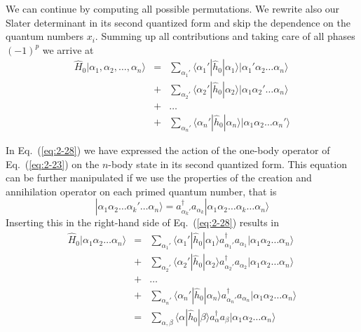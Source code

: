 We can continue by computing all possible permutations. 
We rewrite also our Slater determinant in its second quantized form and skip the dependence on the quantum numbers $x_i.$
Summing up all contributions and taking care of all phases
$(-1)^p$ we arrive at 
\begin{align}
	\hat{H}_0|\alpha_1,\alpha_2,\dots, \alpha_n\rangle &=& \sum_{\alpha_1'}\langle \alpha_1'|\hat{h}_0|\alpha_1\rangle
		|\alpha_1'\alpha_2 \dots \alpha_{n}\rangle \nonumber \\
	&+& \sum_{\alpha_2'} \langle \alpha_2'|\hat{h}_0|\alpha_2\rangle
		|\alpha_1\alpha_2' \dots \alpha_{n}\rangle \nonumber \\
	&+& \dots \nonumber \\
	&+& \sum_{\alpha_n'} \langle \alpha_n'|\hat{h}_0|\alpha_n\rangle
		|\alpha_1\alpha_2 \dots \alpha_{n}'\rangle \label{eq:2-28}
\end{align}

In Eq.~(\ref{eq:2-28}) 
we have expressed the action of the one-body operator
of Eq.~(\ref{eq:2-23}) on the  $n$-body state in its second quantized form.
This equation can be further manipulated if we use the properties of the creation and annihilation operator
on each primed quantum number, that is
\begin{equation}
	|\alpha_1\alpha_2 \dots \alpha_k' \dots \alpha_{n}\rangle = 
		a_{\alpha_k'}^{\dagger}  a_{\alpha_k} |\alpha_1\alpha_2 \dots \alpha_k \dots \alpha_{n}\rangle \label{eq:2-29}
\end{equation}
Inserting this in the right-hand side of Eq.~(\ref{eq:2-28}) results in
\begin{align}
	\hat{H}_0|\alpha_1\alpha_2 \dots \alpha_{n}\rangle &=& \sum_{\alpha_1'}\langle \alpha_1'|\hat{h}_0|\alpha_1\rangle
		a_{\alpha_1'}^{\dagger}  a_{\alpha_1} |\alpha_1\alpha_2 \dots \alpha_{n}\rangle \nonumber \\
	&+& \sum_{\alpha_2'} \langle \alpha_2'|\hat{h}_0|\alpha_2\rangle
		a_{\alpha_2'}^{\dagger}  a_{\alpha_2} |\alpha_1\alpha_2 \dots \alpha_{n}\rangle \nonumber \\
	&+& \dots \nonumber \\
	&+& \sum_{\alpha_n'} \langle \alpha_n'|\hat{h}_0|\alpha_n\rangle
		a_{\alpha_n'}^{\dagger}  a_{\alpha_n} |\alpha_1\alpha_2 \dots \alpha_{n}\rangle \nonumber \\
	&=& \sum_{\alpha, \beta} \langle \alpha|\hat{h}_0|\beta\rangle a_\alpha^{\dagger} a_\beta 
		|\alpha_1\alpha_2 \dots \alpha_{n}\rangle \label{eq:2-30a}
\end{align}

